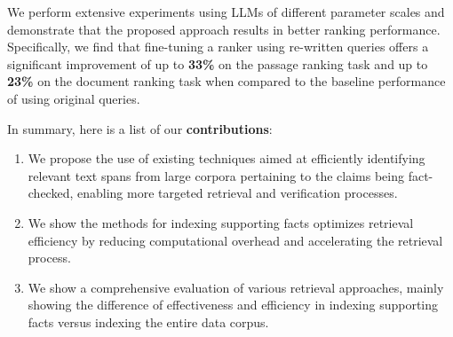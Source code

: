 We perform extensive experiments using LLMs of different parameter scales and demonstrate that the proposed approach results in better ranking performance. 
Specifically, we find that fine-tuning a ranker using re-written queries offers a significant improvement of up to \textbf{33\%} on the passage ranking task and up to \textbf{23\%} on the document ranking task when compared to the baseline performance of using original queries.


\noindent In summary, here is a list of our \textbf{contributions}: 
\begin{enumerate}
    \item We propose the use of existing techniques aimed at efficiently identifying relevant text spans from large corpora pertaining to the claims being fact-checked, enabling more targeted retrieval and verification processes.
    
    \item We show the methods for indexing supporting facts optimizes retrieval efficiency by reducing computational overhead and accelerating the retrieval process.
    
    \item We show a comprehensive evaluation of various retrieval approaches, mainly showing the difference of effectiveness and efficiency in indexing supporting facts versus indexing the entire data corpus. 
\end{enumerate}